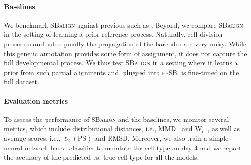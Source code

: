 \begin{table}
    \caption{\textbf{Cell differentiation prediction results.} Shown are distributional metrics (MMD, $\text{W}_{\epsilon}$), alignment-based metrics ($\ell_2$, RMSD), and cell type classification accuracy for different methods on the cell differentiation dataset. \vspace{-5pt}}
    \label{tab:results_cells}
     \centering
\end{table}

\paragraph{Baselines}  We benchmark \textsc{SBalign} against previous  such as \citep[\textsc{fbSB}]{chen2021likelihood}. Beyond, we compare \textsc{SBalign} in the setting of learning a prior reference process. Naturally, cell division processes and subsequently the propagation of the barcodes are very noisy. While this genetic annotation provides some form of assignment, it does not capture the full developmental process. We thus test \textsc{SBalign} in a setting where it learns a prior from such partial alignments and, plugged into \textsc{fbSB}, is fine-tuned on the full dataset.
 
\paragraph{Evaluation metrics} To assess the performance of \textsc{SBalign} and the baselines, we monitor several metrics, which include distributional distances, i.e., MMD~\citep{gretton2012kernel} and $\text{W}_{\epsilon}$~\citep{cuturi2013sinkhorn}, as well as average scores, i.e., $\ell_2(\text{PS})$ \citep{bunne2021learning} and RMSD. Moreover, we also train a simple neural network-based classifier to annotate the cell type on day 4 and we report the accuracy of the predicted vs. true cell type for all the models. 

